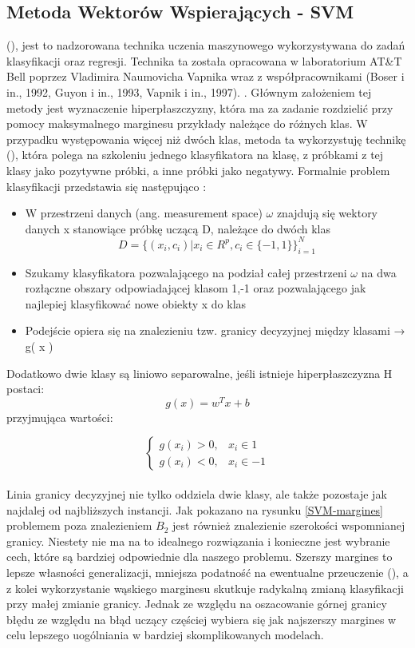 \subsection{Metoda Wektorów Wspierających - SVM}
 (), jest to nadzorowana technika uczenia maszynowego wykorzystywana do zadań klasyfikacji oraz regresji. Technika ta została opracowana w laboratorium AT\&T Bell poprzez Vladimira Naumovicha Vapnika wraz z współpracownikami (Boser i in., 1992, Guyon i in., 1993, Vapnik i in., 1997). \cite{Wiki:SVM}. Głównym założeniem tej metody jest wyznaczenie hiperpłaszczyzny, która ma za zadanie rozdzielić przy pomocy maksymalnego marginesu przykłady należące do różnych klas. W przypadku występowania więcej niż dwóch klas, metoda ta wykorzystuję technikę  (), która polega na szkoleniu jednego klasyfikatora na klasę, z próbkami z tej klasy jako pozytywne próbki, a inne próbki jako negatywy. Formalnie problem klasyfikacji przedstawia się następująco \cite{Prezentacja:SVM2}: 
\begin{itemize}
    \item W przestrzeni danych (ang. measurement space) $\omega$ znajdują się wektory danych x stanowiące próbkę uczącą D, należące do dwóch klas\\
    \begin{equation}
D = \big\{(x_{i}, c_{i}) | x_{i} \in R^{p}, c_{i} \in \{-1, 1\}\big\}_{i=1}^{N}
    \end{equation}
    \item Szukamy klasyfikatora pozwalającego na podział całej przestrzeni $\omega$ na dwa rozłączne obszary odpowiadającej klasom {1,-1} oraz pozwalającego jak najlepiej klasyfikować nowe obiekty x do klas
    \item Podejście opiera się na znalezieniu tzw. granicy decyzyjnej między klasami → g( x )
\end{itemize}
Dodatkowo dwie klasy są liniowo separowalne, jeśli istnieje hiperpłaszczyzna H postaci: \[g(x) = w^Tx + b\] przyjmująca wartości: 

\[
    \begin{cases}
            g(x_{i}) > 0,& x_{i} \in 1 \\
            g(x_{i}) < 0,& x_{i} \in -1
    \end{cases}
\]
\\

Linia granicy decyzyjnej nie tylko oddziela dwie klasy, ale także pozostaje jak najdalej od najbliższych instancji. Jak pokazano na rysunku \ref{SVM-margines} problemem poza znalezieniem $B_{2}$ jest również znalezienie szerokości wspomnianej granicy. Niestety nie ma na to idealnego rozwiązania i konieczne jest wybranie cech, które są bardziej odpowiednie dla naszego problemu. Szerszy margines to lepsze własności generalizacji, mniejsza podatność na
ewentualne przeuczenie (), a z kolei wykorzystanie wąskiego marginesu skutkuje radykalną zmianą klasyfikacji przy małej zmianie granicy. Jednak ze względu na oszacowanie górnej granicy błędu ze względu na błąd uczący częściej wybiera się jak najszerszy margines w celu lepszego uogólniania w bardziej skomplikowanych modelach.

